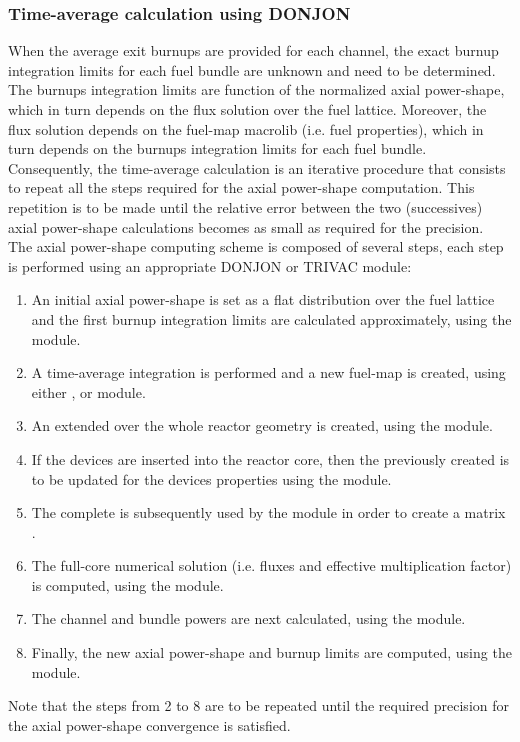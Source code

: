 \vskip 0.2cm
\subsubsection{Time-average calculation using DONJON}

When the average exit burnups are provided for each channel, the exact
burnup integration limits for each fuel bundle are unknown and need to be
determined. The burnups integration limits are function of the normalized
axial power-shape, which in turn depends on the flux solution over the fuel
lattice. Moreover, the flux solution depends on the fuel-map macrolib (i.e.
fuel properties), which in turn depends on the burnups integration limits for
each fuel bundle. Consequently, the time-average calculation is an iterative
procedure that consists to repeat all the steps required for the axial power-shape
computation. This repetition is to be made until the relative error between
the two (successives) axial power-shape calculations becomes as small
as required for the precision.\\

\noindent
The axial power-shape computing scheme is composed of several steps,
each step is performed using an appropriate DONJON or TRIVAC module:

\begin{enumerate}
\item An initial axial power-shape is set as a flat distribution over the fuel
lattice and the first burnup integration limits are calculated approximately,
using the  module. 
\item A time-average integration is performed and a new fuel-map 
is created, using either ,  or  module.
\item An extended  over the whole reactor geometry is created,
using the  module.
\item If the devices are inserted into the reactor core, then the previously
created  is to be updated for the devices properties using the
 module. 
\item The complete  is subsequently used by the 
module in order to create a matrix . 
\item The full-core numerical solution (i.e. fluxes and effective multiplication factor)
is computed, using the  module.
\item The channel and bundle powers are next calculated, using the
 module. 
\item Finally, the new axial power-shape and burnup limits are computed,
using the  module.
\end{enumerate}

\vskip 0.1cm
\noindent
Note that the steps from 2 to 8 are to be repeated until the required precision
for the axial power-shape convergence is satisfied.

\clearpage
